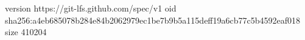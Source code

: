 version https://git-lfs.github.com/spec/v1
oid sha256:a4eb685078b284e84b2062979ec1be7b9b5a115deff19a6cb77c5b4592eaf018
size 410204
